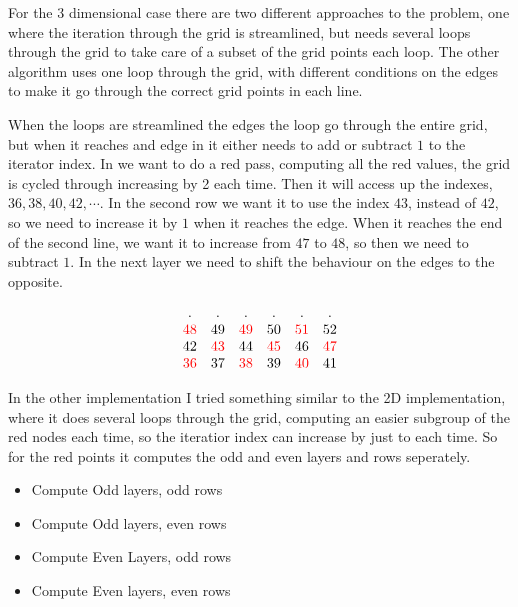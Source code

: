 	For the 3 dimensional case there are two different approaches to the problem, one where the iteration through the grid is streamlined, but needs
	several loops through the grid to take care of a subset of the grid points each loop. The other algorithm uses one loop through the grid,
	with different conditions on the edges to make it go through the correct grid points in each line.

	When the loops are streamlined the edges the loop go through the entire grid, but when it reaches and edge in it either needs to add or subtract \(1\) to
	the iterator index. In \label{eq:RB_loop} we want to do a red pass, computing all the red values, the grid is cycled through increasing by 2 each time.
	Then it will access up the indexes, \(36, 38, 40,42, \cdots\). In the second row we want it to use the index \(43\), instead of \(42\), so we need to
	increase it by \(1\) when it reaches the edge. When it reaches the end of the second line, we want it to increase from \(47\) to \(48\),
	so then we need to subtract \(1\). In the next layer we need to shift the behaviour on the edges to the opposite.

	\[
	\begin{matrix}
	.	&	.	&	. &	.	& .	& .
	\\
	\textcolor{red}{48} &49 &\textcolor{red}{49} &50 & \textcolor{red}{51} &52
	\\
	42	& \textcolor{red}{43} &44 &\textcolor{red}{45} &46 &\textcolor{red}{47}
	\\
	\textcolor{red}{36} & 37 &\textcolor{red}{38}  &39 & \textcolor{red}{40} & 41
	\end{matrix}
	\label{eq:RB-loop}
	\]

	In the other implementation I tried something similar to the 2D implementation, where it does several
	loops through the grid, computing an easier subgroup of the red nodes each time, so the iteratior index
	can increase by just to each time. So for the red points it computes the odd and even layers and rows seperately.

	\begin{itemize}
		\item Compute Odd layers, odd rows
		\item Compute Odd layers, even rows
		\item Compute Even Layers, odd rows
		\item Compute Even layers, even rows
	\end{itemize}


